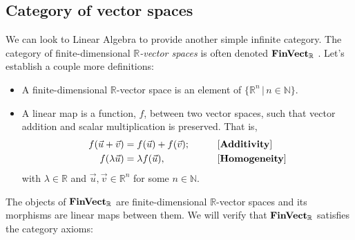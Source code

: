 \documentclass[10pt,a4paper,reqno]{amsart}
\numberwithin{figure}{section}
\begin{document}
\subsection{Category of vector spaces}
We can look to Linear Algebra to provide another simple infinite category. The
category of finite-dimensional $\mathbb{R}$\emph{-vector spaces} is often denoted
$\operatorname{\mathbf{FinVect}_\mathbb{R}}$ \autocite{Hasegawa:2008}. Let's establish a couple more definitions:
\begin{itemize}
        \item A finite-dimensional $\mathbb{R}$-vector space is an element of
                $\{ \mathbb{R} ^n \, | \, n \in \mathbb{N} \}$.
        \item A linear map is a function, $f$, between two vector spaces,
                such that vector addition and scalar multiplication is
                preserved. That is,
                \begin{alignat*}{2}
                        f( \vec{u} + \vec{v} ) &= f( \vec{u} ) + f( \vec{v} );
                        \qquad && \text{[\textbf{Additivity}]} \\
                        f( \lambda \vec{u} ) &= \lambda f( \vec{u} ),
                        \qquad && \text{[\textbf{Homogeneity}]}
                \end{alignat*}
                with $\lambda \in \mathbb{R}$ and
                $\vec{u},\vec{v} \in \mathbb{R} ^n$ for some $n \in \mathbb{N}$.
\end{itemize}
The objects of $\operatorname{\mathbf{FinVect}_\mathbb{R}}$ are finite-dimensional $\mathbb{R}$-vector spaces
and its morphisms are linear maps between them. We will verify that
$\operatorname{\mathbf{FinVect}_\mathbb{R}}$ satisfies the category axioms: 
\end{document}
